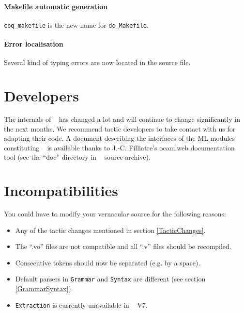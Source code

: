 \documentclass[11pt]{article}
\begin{document}
\paragraph{Makefile automatic generation} {\tt coq\_makefile} is the
new name for {\tt do\_Makefile}.

\paragraph{Error localisation} Several kind of typing errors are now
located in the source file.

\section{Developers}
\label{Developers}
The internals of \Coq~ has changed a lot and will continue to change
significantly in the next months. We recommend tactic developers to
take contact with us for adapting their code. A document describing
the interfaces of the ML modules constituting \Coq~ is available
thanks to J.-C. Filliatre's ocamlweb
documentation tool (see the ``doc'' directory in \Coq~ source archive).

\section{Incompatibilities}
\label{Incompatibilities}

  You could have to modify your vernacular source for the following
  reasons:

  \begin{itemize}
 
  \item Any of the tactic changes mentioned in section \ref{TacticChanges}.

  \item The ``.vo'' files are not compatible and all ``.v'' files should
  be recompiled.

  \item Consecutive tokens should now be separated (e.g. by a space).

  \item Default parsers in {\tt Grammar} and {\tt Syntax} are
  different (see section \ref{GrammarSyntax}).

  \item {\tt Extraction} is currently unavailable in \Coq~ V7.

  \end{itemize}
\end{document}
